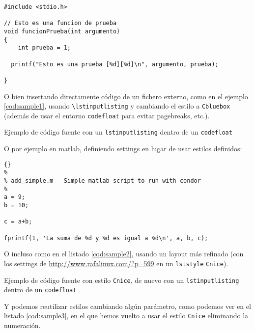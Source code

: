 \begin{lstlisting}[style=CppExample]
#include <stdio.h>

// Esto es una funcion de prueba
void funcionPrueba(int argumento)
{	
	int prueba = 1;

  printf("Esto es una prueba [%d][%d]\n", argumento, prueba);

}
\end{lstlisting}

O bien insertando directamente código de un fichero externo, como en el
ejemplo \ref{cod:sample1}, usando
\texttt{\textbackslash{}lstinputlisting} y cambiando el estilo a
\texttt{Cbluebox} (además de usar el entorno \texttt{codefloat} para
evitar pagebreaks, etc.).


\begin{codefloat}

\caption{Ejemplo de código fuente con un \texttt{lstinputlisting} dentro
de un \texttt{codefloat}}
\label{cod:sample1}
\end{codefloat}


O por ejemplo en matlab, definiendo settings en lugar de usar estilos
definidos:

\lstset{language=matlab}
\lstset{tabsize=2}
\lstset{commentstyle=\textit}
\lstset{stringstyle=\ttfamily, basicstyle=\small}
\begin{lstlisting}[frame=trbl]{}
%
% add_simple.m - Simple matlab script to run with condor
%
a = 9;
b = 10;

c = a+b;

fprintf(1, 'La suma de %d y %d es igual a %d\n', a, b, c);
\end{lstlisting}

O incluso como en el listado \ref{cod:sample2}, usando un layout más refinado (con
los settings de \url{http://www.rafalinux.com/?p=599} en un \texttt{lststyle}
\texttt{Cnice}).


\begin{codefloat}

\caption{Ejemplo de código fuente con estilo \texttt{Cnice}, de nuevo
  con un \texttt{lstinputlisting} dentro de un \texttt{codefloat}}
\label{cod:sample2}
\end{codefloat}

Y podemos reutilizar estilos cambiando algún parámetro, como podemos ver
en el listado \ref{cod:sample3}, en el que hemos vuelto a usar el estilo
\texttt{Cnice} eliminando la numeración.


